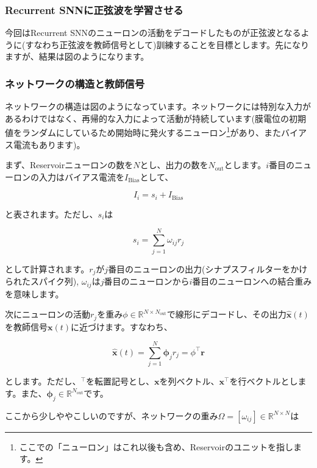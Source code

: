 \subsubsection{Recurrent SNNに正弦波を学習させる}
今回はRecurrent SNNのニューロンの活動をデコードしたものが正弦波となるように(すなわち正弦波を教師信号として)訓練することを目標とします。先になりますが、結果は図のようになります。

\subsubsection{ネットワークの構造と教師信号}
ネットワークの構造は図のようになっています。ネットワークには特別な入力があるわけではなく、再帰的な入力によって活動が持続しています(膜電位の初期値をランダムにしているため開始時に発火するニューロン\footnote{ここでの「ニューロン」はこれ以後も含め、Reservoirのユニットを指します。}があり、またバイアス電流もあります)。\par
まず、Reservoirニューロンの数を$N$とし、出力の数を$N_\text{out}$とします。$i$番目のニューロンの入力はバイアス電流を$I_{\text{Bias}}$として、


\begin{equation}
I_i=s_i+I_{\text{Bias}}    
\end{equation}


と表されます。ただし、$s_i$は 


\begin{equation}
s_{i}=\sum_{j=1}^{N} \omega_{i j} r_{j}    
\end{equation}


として計算されます。$r_j$が$j$番目のニューロンの出力(シナプスフィルターをかけられたスパイク列), $\omega_{i j}$は$j$番目のニューロンから$i$番目のニューロンへの結合重みを意味します。\par
次にニューロンの活動$r_j$を重み$\phi\in \mathbb{R}^{N\times N_\text{out}}$で線形にデコードし、その出力$\hat{\boldsymbol{x}}(t)$を教師信号$\boldsymbol{x}(t)$に近づけます。すなわち、


\begin{equation}
\hat{\boldsymbol{x}}(t)=\sum_{j=1}^{N} \boldsymbol{\phi}_j r_{j}=\phi^\intercal\boldsymbol{r}
\end{equation}


とします。ただし、$^\intercal$を転置記号とし、$\boldsymbol{x}$を列ベクトル、$\boldsymbol{x}^\intercal$を行ベクトルとします。また、$\boldsymbol{\phi}_j\in \mathbb{R}^{N_\text{out}}$です。\par
ここから少しややこしいのですが、ネットワークの重み$\Omega=[\omega_{ij}]\in \mathbb{R}^{N\times N}$は 



